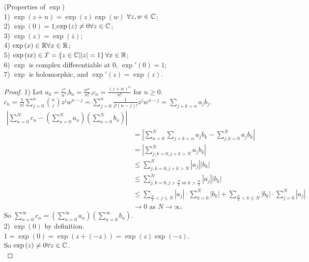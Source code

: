 \documentclass[a4paper]{article}
\begin{document}
\begin{thm} (Properties of $\exp$)\\
1) $\exp\left(z+n\right)=\exp\left(z\right)\exp\left(w\right)$ $\forall z,w\in\mathbb{C}$;\\
2) $\exp\left(0\right)=1$,$\exp\left(z\right)\neq 0 \forall z\in\mathbb{C}$;\\
3) $\overline{\exp\left(z\right)}=\exp\left(\overline{z}\right)$;\\
4) $\exp\left(x\right)\in\mathbb{R} \forall x\in\mathbb{R}$;\\
5) $\exp\left(ix\right)\in T=\left\{z\in\mathbb{C} | |z|=1\right\} \forall x\in\mathbb{R}$;\\
6) $\exp$ is complex differentiable at $0$, $\exp'\left(0\right)=1$;\\
7) $\exp$ is holomorphic, and $\exp'\left(z\right) = \exp\left(z\right)$.\\
\begin{proof}
1) Let $a_{k}=\frac{z^n}{n'}$,$b_{n}=\frac{w^n}{n!}$,$c_{n}=\frac{\left(z+w\right)^n}{n!}$ for $n\geq 0$.\\
$c_{n} = \frac{1}{n!}\sum_{j=0}^n {n \choose j} z^j w^{n-j} = \sum_{j=0}^n \frac{1}{j!\left(n-j\right)!}z^j w^{n-j} = \sum_{j+k=n} a_{j} b_{j}$.\\
\begin{equation*}
\begin{aligned}
|\sum_{n=0}^N c_{n} - \left(\sum_{n=0}^N a_{n}\right)\left(\sum_{n=0}^N b_{n}\right)|\\
&= |\sum_{n=0}^N \sum_{j+k=n} a_{j} b_{k} - \sum_{j,k=0}^N a_{j} b_{k}|\\
&= |\sum_{j,k=0,j+k>N}^N a_{j} b_{k}|\\
&\leq \sum_{j,k=0,j+k>N}^N |a_{j}||b_{k}|\\
&\leq \sum_{j,k=0,j>\frac{N}{2} \text{ or } k>\frac{N}{2}}^N |a_{j}| |b_{k}|\\
&\leq \sum_{\frac{N}{2}<j\leq N} |a_{j}| \cdot \sum_{k=0}^N |b_{k}| + \sum_{\frac{N}{2}<k\leq N} |b_{k}| \cdot \sum_{j=0}^N |a_{j}|\\
&\to 0 \text{ as } N\to\infty.
\end{aligned}
\end{equation*}
So $\sum_{n=0}^\infty c_{n} = \left(\sum_{n=0}^\infty a_{n}\right)\left(\sum_{n=0}^\infty b_{n}\right)$.\\

2) $\exp\left(0\right)$ by definition.\\
$1=\exp\left(0\right)=\exp\left(z+\left(-z\right)\right)=\exp\left(z\right)\exp\left(-z\right)$.\\
So $\exp\left(z\right)\neq 0 \forall z\in \mathbb{C}$.\\


\end{proof}
\end{thm}
\end{document}
